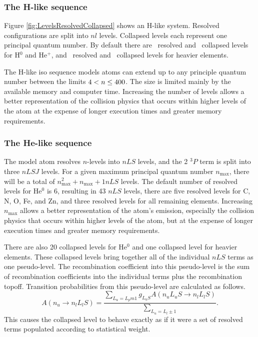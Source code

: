 \subsubsection{The H-like sequence}
Figure \ref{fig:LevelsResolvedCollapsed} shows an H-like system.
Resolved configurations are split into $nl$ levels.
Collapsed levels each represent one principal quantum number.
By default there are \nDefaultResLevelsHlike ~resolved and \nDefaultColLevelsHlike ~collapsed levels for H$^0$ and He$^+$,
and \nDefaultResLevelsHlikeall ~resolved and \nDefaultColLevelsHlikeall ~collapsed levels for heavier elements.

The H-like iso sequence models atoms can extend up to any principle
quantum number between the limits $4 < n \le {400}$.
The size is limited mainly
by the available memory and computer time.
Increasing the
number of levels allows a better representation of the collision physics
that occurs within higher levels of the atom at the expense of longer
execution times and greater memory requirements.

\subsubsection{The He-like sequence}

The model atom resolves $n$-levels into $nLS$ levels,
and the 2 $^3P$ term is split into three $nLSJ$ levels.
For a given maximum principal quantum number
$n_{\max}$, there will be a total of $n_{\max}^2 + n_{\max} +1 nLS$ levels.  
The default number of resolved levels for He$^0$ is 6, resulting in
43 $nLS$ levels, 
there are five resolved levels
for C, N, O, Fe, and Zn, and three resolved levels
for all remaining elements.
Increasing $n_{\max}$ allows a better representation of the atom's
emission,
especially the collision physics that occurs within higher levels
of the atom,
but at the expense of longer execution times and greater memory
requirements.

There are also 20 collapsed levels for He$^0$ and one collapsed level for heavier elements.
These collapsed levels
bring together all of the individual $nLS$ terms as one pseudo-level.
The
recombination coefficient into this pseudo-level is the sum of recombination
coefficients into the individual terms plus the recombination topoff.
Transition probabilities from this pseudo-level are calculated as follows.
\begin{equation}
A(n_u \to n_lL_lS)= \frac{\sum_{L_u=L_pm 1} g_{L_{u}S} A(n_uL_uS\to
n_lL_lS)}{\sum_{L_u=L_l\pm 1}}.%
\end{equation}
This causes the collapsed level to behave exactly as if it were a set of
resolved terms populated according to statistical weight.

